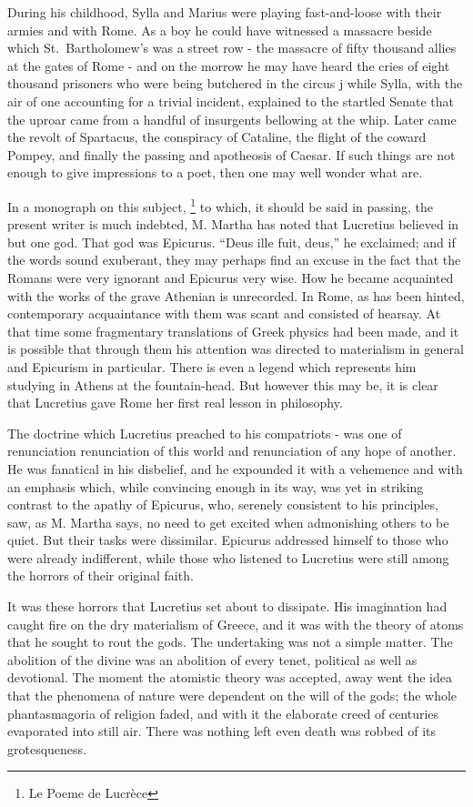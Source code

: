 \documentclass[]{book}
\let\rmarkdownfootnote\footnote%
\def\footnote{\protect\rmarkdownfootnote}
\begin{document}
During his childhood, Sylla and Marius were playing fast-and-loose with
their armies and with Rome. As a boy he could have witnessed a massacre
beside which St.~Bartholomew's was a street row - the massacre of fifty
thousand allies at the gates of Rome - and on the morrow he may have
heard the cries of eight thousand prisoners who were being butchered in
the circus j while Sylla, with the air of one accounting for a trivial
incident, explained to the startled Senate that the uproar came from a
handful of insurgents bellowing at the whip. Later came the revolt of
Spartacus, the conspiracy of Cataline, the flight of the coward Pompey,
and finally the passing and apotheosis of Caesar. If such things are not
enough to give impressions to a poet, then one may well wonder what are.

In a monograph on this subject, \footnote{Le Poeme de Lucrèce} to which,
it should be said in passing, the present writer is much indebted, M.
Martha has noted that Lucretius believed in but one god. That god was
Epicurus. ``Deus ille fuit, deus,'' he exclaimed; and if the words sound
exuberant, they may perhaps find an excuse in the fact that the Romans
were very ignorant and Epicurus very wise. How he became acquainted with
the works of the grave Athenian is unrecorded. In Rome, as has been
hinted, contemporary acquaintance with them was scant and consisted of
hearsay. At that time some fragmentary translations of Greek physics had
been made, and it is possible that through them his attention was
directed to materialism in general and Epicurism in particular. There is
even a legend which represents him studying in Athens at the
fountain-head. But however this may be, it is clear that Lucretius gave
Rome her first real lesson in philosophy.

The doctrine which Lucretius preached to his compatriots - was one of
renunciation renunciation of this world and renunciation of any hope of
another. He was fanatical in his disbelief, and he expounded it with a
vehemence and with an emphasis which, while convincing enough in its
way, was yet in striking contrast to the apathy of Epicurus, who,
serenely consistent to his principles, saw, as M. Martha says, no need
to get excited when admonishing others to be quiet. But their tasks were
dissimilar. Epicurus addressed himself to those who were already
indifferent, while those who listened to Lucretius were still among the
horrors of their original faith.

It was these horrors that Lucretius set about to dissipate. His
imagination had caught fire on the dry materialism of Greece, and it was
with the theory of atoms that he sought to rout the gods. The
undertaking was not a simple matter. The abolition of the divine was an
abolition of every tenet, political as well as devotional. The moment
the atomistic theory was accepted, away went the idea that the phenomena
of nature were dependent on the will of the gods; the whole
phantasmagoria of religion faded, and with it the elaborate creed of
centuries evaporated into still air. There was nothing left even death
was robbed of its grotesqueness.
\end{document}
